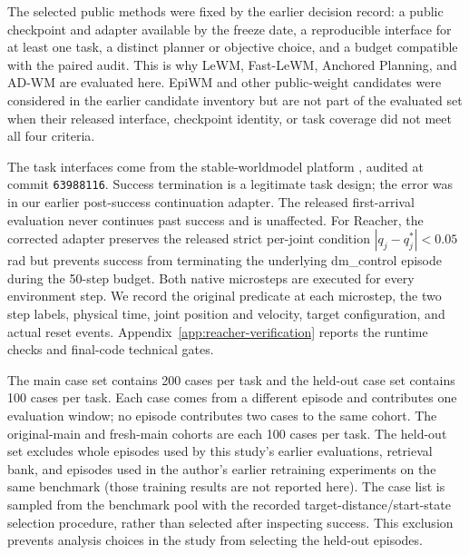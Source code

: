 \documentclass[manuscript,screen,review]{jair}
\begin{document}
The selected public methods were fixed by the earlier decision record: a public checkpoint and adapter available by the freeze date, a reproducible interface for at least one task, a distinct planner or objective choice, and a budget compatible with the paired audit. This is why LeWM, Fast-LeWM, Anchored Planning, and AD-WM are evaluated here. EpiWM and other public-weight candidates were considered in the earlier candidate inventory but are not part of the evaluated set when their released interface, checkpoint identity, or task coverage did not meet all four criteria.

The task interfaces come from the stable-worldmodel platform \parencite{stableworldmodel2026}, audited at commit \texttt{63988116}. Success termination is a legitimate task design; the error was in our earlier post-success continuation adapter. The released first-arrival evaluation never continues past success and is unaffected. For Reacher, the corrected adapter preserves the released strict per-joint condition $|q_j-q_j^*|<0.05$ rad but prevents success from terminating the underlying dm\_control episode during the 50-step budget. Both native microsteps are executed for every environment step. We record the original predicate at each microstep, the two step labels, physical time, joint position and velocity, target configuration, and actual reset events. Appendix~\ref{app:reacher-verification} reports the runtime checks and final-code technical gates.

The main case set contains 200 cases per task and the held-out case set contains 100 cases per task. Each case comes from a different episode and contributes one evaluation window; no episode contributes two cases to the same cohort. The original-main and fresh-main cohorts are each 100 cases per task. The held-out set excludes whole episodes used by this study's earlier evaluations, retrieval bank, and episodes used in the author's earlier retraining experiments on the same benchmark (those training results are not reported here). The case list is sampled from the benchmark pool with the recorded target-distance/start-state selection procedure, rather than selected after inspecting success. This exclusion prevents analysis choices in the study from selecting the held-out episodes.

\end{document}
